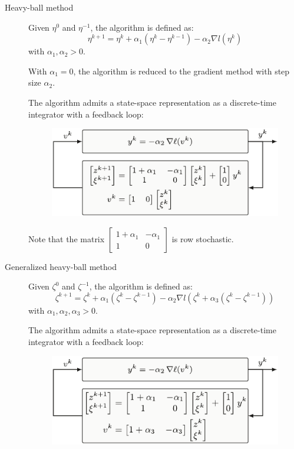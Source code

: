 \begin{description}
    \item[Heavy-ball method] 
        Given $\eta^0$ and $\eta^{-1}$, the algorithm is defined as:
        \[
            \eta^{k+1} = \eta^k + \alpha_1 (\eta^k - \eta^{k-1}) - \alpha_2 \nabla l(\eta^k)
        \]
        with $\alpha_1, \alpha_2 > 0$.

        \begin{remark}
            With $\alpha_1 = 0$, the algorithm is reduced to the gradient method with step size $\alpha_2$.
        \end{remark}

        \begin{remark}
            The algorithm admits a state-space representation as a discrete-time integrator with a feedback loop:
            \begin{figure}[H]
                \centering
                \includegraphics[width=0.55\linewidth]{./img/_heavy_ball.pdf}
            \end{figure}

            Note that the matrix $\begin{bmatrix} 1+\alpha_1 & -\alpha_1 \\ 1 & 0 \end{bmatrix}$ is row stochastic.
        \end{remark}

    \item[Generalized heavy-ball method] 
        Given $\zeta^0$ and $\zeta^{-1}$, the algorithm is defined as:
        \[
            \zeta^{k+1} = \zeta^k + \alpha_1 (\zeta^k - \zeta^{k-1}) - \alpha_2 \nabla l(\zeta^k + \alpha_3(\zeta^k - \zeta^{k-1}))
        \]
        with $\alpha_1, \alpha_2, \alpha_3 > 0$.

        \begin{remark}
            The algorithm admits a state-space representation as a discrete-time integrator with a feedback loop:
            \begin{figure}[H]
                \centering
                \includegraphics[width=0.55\linewidth]{./img/_generalized_heavy_ball.pdf}
            \end{figure}
        \end{remark}
\end{description}



